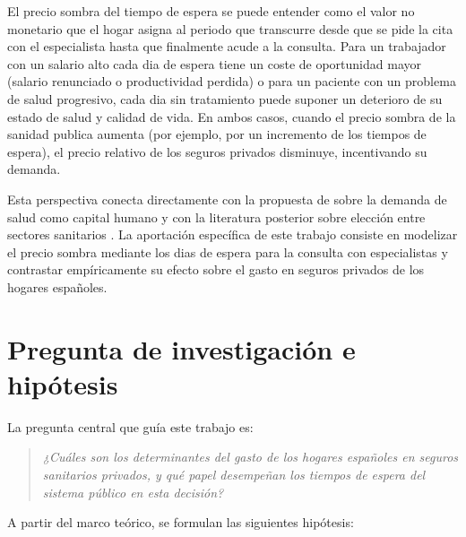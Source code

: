 El precio sombra del tiempo de espera se puede entender como el valor no monetario que el hogar asigna
al periodo que transcurre desde que se pide la cita con el especialista hasta que finalmente acude a 
la consulta. Para un trabajador con un salario alto cada dia de espera tiene un coste de oportunidad mayor (salario 
renunciado o productividad perdida) o para un paciente con un problema de salud progresivo, cada dia sin 
tratamiento puede suponer un deterioro de su estado de salud y calidad de vida. En ambos casos, cuando el precio
sombra de la sanidad publica aumenta (por ejemplo, por un incremento de los tiempos de espera), el precio 
relativo de los seguros privados disminuye, incentivando su demanda. 

Esta perspectiva conecta directamente con la propuesta de \textcite{Grossman1972}
sobre la demanda de salud como capital humano y con la literatura posterior sobre
elección entre sectores sanitarios \parencite{Propper2000, Besley1999}. La
aportación específica de este trabajo consiste en modelizar el precio sombra
mediante los dias de espera para la consulta con especialistas y contrastar
empíricamente su efecto sobre el gasto en seguros privados de los hogares
españoles.

\section{Pregunta de investigación e hipótesis}

La pregunta central que guía este trabajo es:

\begin{quote}
\textit{¿Cuáles son los determinantes del gasto de los hogares españoles en
seguros sanitarios privados, y qué papel desempeñan los tiempos de espera del
sistema público en esta decisión?}
\end{quote}

A partir del marco teórico, se formulan las siguientes hipótesis:

